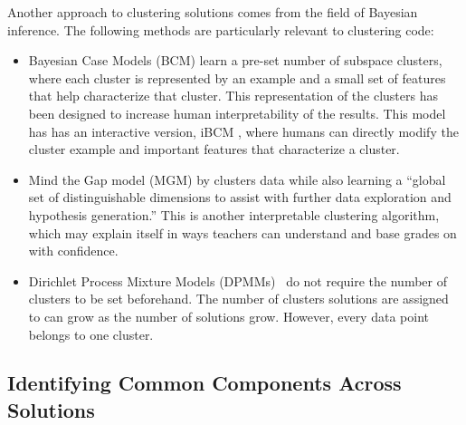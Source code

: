 Another approach to clustering solutions comes from the field of Bayesian inference. The following methods are particularly relevant to clustering code:
\begin{itemize}
\item Bayesian Case Models (BCM) \citet{beenNIPS} learn a pre-set number of subspace clusters, where each cluster is represented by an example and a small set of features that help characterize that cluster. This representation of the clusters has been designed to increase human interpretability of the results. This model has has an interactive version, iBCM \cite{beenthesis}, where humans can directly modify the cluster example and important features that characterize a cluster.
\item Mind the Gap model (MGM) by \citet{kim2015mind} clusters data while also learning a ``global set of distinguishable dimensions to assist with further data exploration and hypothesis generation.'' This is another interpretable clustering algorithm, which may explain itself in ways teachers can understand and base grades on with confidence.
\item Dirichlet Process Mixture Models (DPMMs)~\cite{} do not require the number of clusters to be set beforehand. The number of clusters solutions are assigned to can grow as the number of solutions grow. However, every data point belongs to one cluster.
\end{itemize}







\subsection{Identifying Common Components Across Solutions}

